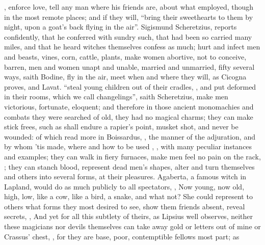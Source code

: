 , enforce love, tell any man
where his friends are, about what employed, though in the most remote places;
and if they will, \enquote{bring their sweethearts to them by
night, upon a goat's back flying in the air}. Sigismund Scheretzius,
 reports confidently, that he
conferred with sundry such, that had been so carried many miles, and that he
heard witches themselves confess as much; hurt and infect men and beasts,
vines, corn, cattle, plants, make women abortive, not to conceive,
barren, men and women unapt and unable, married and
unmarried, fifty several ways, saith Bodine,  fly in the air, meet when and where they will, as Cicogna proves, and
Lavat.  \enquote{steal young children
out of their cradles, , and put deformed in their
rooms, which we call changelings}, saith Scheretzius,
 make men victorious, fortunate, eloquent;
and therefore in those ancient monomachies and combats they were searched of
old, they had no magical charms; they can make
stick frees, such as shall endure a rapier's point, musket
shot, and never be wounded: of which read more in Boissardus,
, the manner of the adjuration, and by
whom 'tis made, where and how to be used , \etc{}, with many peculiar instances and examples; they can
walk in fiery furnaces, make men feel no pain on the rack, ; they can stanch blood, represent dead
men's shapes, alter and turn themselves and others into several forms, at their
pleasures. Agaberta, a famous witch in Lapland, would do
as much publicly to all spectators, , \etc{} Now young, now old, high, low,
like a cow, like a bird, a snake, and what not? She could represent to others
what forms they most desired to see, show them friends absent, reveal secrets,
, \etc{} And yet for all this subtlety of theirs,
as Lipsius well observes,  neither these magicians nor devils themselves can take away gold or
letters out of mine or Crassus' chest, , for
they are base, poor, contemptible fellows most part; as
